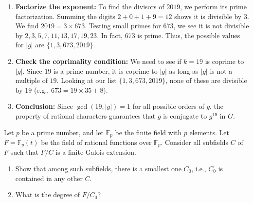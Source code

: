 \begin{solution}
\begin{enumerate}
    \item \textbf{Factorize the exponent:} To find the divisors of $2019$, we perform its prime factorization. Summing the digits $2+0+1+9 = 12$ shows it is divisible by $3$. We find $2019 = 3 \times 673$. Testing small primes for $673$, we see it is not divisible by $2, 3, 5, 7, 11, 13, 17, 19, 23$. In fact, $673$ is prime. Thus, the possible values for $|g|$ are $\{1, 3, 673, 2019\}$.

    \item \textbf{Check the coprimality condition:} We need to see if $k=19$ is coprime to $|g|$. Since $19$ is a prime number, it is coprime to $|g|$ as long as $|g|$ is not a multiple of $19$. Looking at our list $\{1, 3, 673, 2019\}$, none of these are divisible by $19$ (e.g., $673 = 19 \times 35 + 8$).

    \item \textbf{Conclusion:} Since $\gcd(19, |g|) = 1$ for all possible orders of $g$, the property of rational characters guarantees that $g$ is conjugate to $g^{19}$ in $G$.
\end{enumerate}
\end{solution}

\begin{exercise}
\label{algebra:2019:2}
Let $p$ be a prime number, and let $\mathbb{F}_p$ be the finite field with $p$ elements. Let $F = \mathbb{F}_p(t)$ be the field of rational functions over $\mathbb{F}_p$. Consider all subfields $C$ of $F$ such that $F/C$ is a finite Galois extension.

\begin{enumerate}
    \item Show that among such subfields, there is a smallest one $C_0$, i.e., $C_0$ is contained in any other $C$.
    \item What is the degree of $F/C_0$?
\end{enumerate}
\end{exercise}

